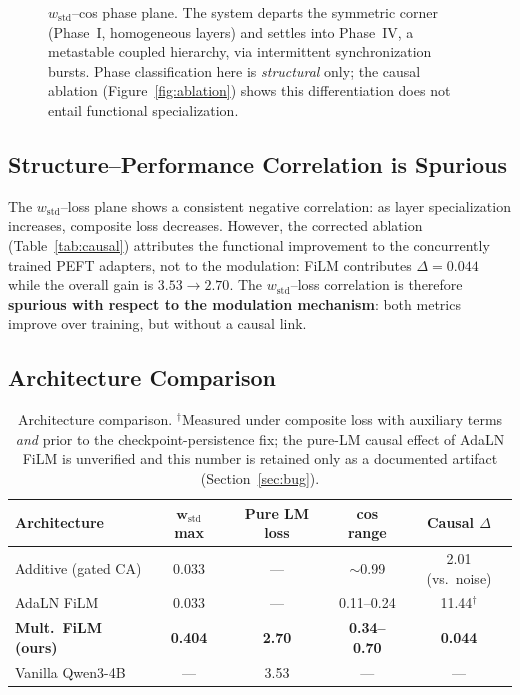 \documentclass[11pt,a4paper]{article}
\newcommand{\wstd}{w_{\mathrm{std}}}
\begin{document}
\begin{figure}[H]
\caption{$\wstd$--cos phase plane. The system departs the symmetric corner (Phase~I,
homogeneous layers) and settles into Phase~IV, a metastable coupled hierarchy, via
intermittent synchronization bursts. Phase classification here is \emph{structural}
only; the causal ablation (Figure~\ref{fig:ablation}) shows this differentiation does
not entail functional specialization.}
\label{fig:phase-plane}
\end{figure}

\subsection{Structure--Performance Correlation is Spurious}

The $\wstd$--loss plane shows a consistent negative correlation: as layer
specialization increases, composite loss decreases. However, the corrected ablation
(Table~\ref{tab:causal}) attributes the functional improvement to the concurrently
trained PEFT adapters, not to the modulation: FiLM contributes $\Delta=0.044$ while
the overall gain is $3.53\to2.70$. The $\wstd$--loss correlation is therefore
\textbf{spurious with respect to the modulation mechanism}: both metrics improve over
training, but without a causal link.

\subsection{Architecture Comparison}

\begin{table}[h]
\centering
\begin{tabular}{lcccc}
\toprule
\textbf{Architecture} & $\boldsymbol{\wstd}$ max & \textbf{Pure LM loss} & \textbf{cos range} & \textbf{Causal $\Delta$} \\
\midrule
Additive (gated CA)         & 0.033          & ---           & $\sim$0.99    & 2.01 (vs.\ noise) \\
AdaLN FiLM                  & 0.033          & ---           & 0.11--0.24    & 11.44$^\dagger$ \\
\textbf{Mult.\ FiLM (ours)} & \textbf{0.404} & \textbf{2.70} & \textbf{0.34--0.70} & \textbf{0.044} \\
Vanilla Qwen3-4B            & ---            & 3.53          & ---           & --- \\
\bottomrule
\end{tabular}
\caption{Architecture comparison.
$^\dagger$Measured under composite loss with auxiliary terms \emph{and} prior to the
checkpoint-persistence fix; the pure-LM causal effect of AdaLN FiLM is unverified and
this number is retained only as a documented artifact (Section~\ref{sec:bug}).}
\label{tab:arch}
\end{table}
\end{document}
